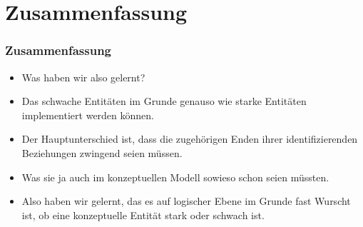 \documentclass[aspectratio=169,mathserif,notheorems]{beamer}%
\begin{document}
\section{Zusammenfassung}%
%
\begin{frame}%
\frametitle{Zusammenfassung}%
\begin{itemize}%
\item Was haben wir also gelernt?%
\item<2-> Das schwache Entitäten im Grunde genauso wie starke Entitäten implementiert werden können.%
\item<3-> Der Hauptunterschied ist, dass die zugehörigen Enden ihrer identifizierenden Beziehungen zwingend seien müssen.%
\item<4-> Was sie ja auch im konzeptuellen Modell sowieso schon seien müssten.%
\item<5-> Also haben wir gelernt, das es auf logischer Ebene im Grunde fast Wurscht ist, ob eine konzeptuelle Entität stark oder schwach ist.%
\end{itemize}%
\end{frame}%
\endPresentation%
\end{document}
